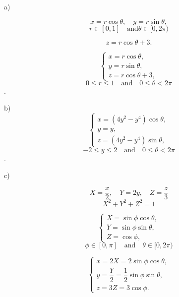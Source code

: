 \documentclass{report}
\begin{document}
\newpage 


    a)

    \[ x = r \cos\theta, \quad y = r \sin\theta, \]
    \[ r \in [0, 1] \quad  \text{and} \theta \in [0, 2\pi) \]

    \[ z = r \cos\theta + 3. \]

    \[ \begin{cases}
    x = r \cos\theta, \\
    y = r \sin\theta, \\
    z = r \cos\theta + 3,
    \end{cases} \]
    \[ 0 \leq r \leq 1 \quad  \text{and} \quad  0 \leq \theta < 2\pi \].

    b)
    \[ \begin{cases}
    x = \left(4y^2 - y^4\right) \cos\theta, \\
    y = y, \\
    z = \left(4y^2 - y^4\right) \sin\theta,
    \end{cases} \]
    \[ -2 \leq y \leq 2 \quad \text{and} \quad 0 \leq \theta < 2\pi \].


    c)

    \[ X = \dfrac{x}{2}, \quad Y = 2y, \quad Z = \dfrac{z}{3} \]
    \[ X^2 + Y^2 + Z^2 = 1 \]

    \[ \begin{cases}
    X = \sin\phi \cos\theta, \\
    Y = \sin\phi \sin\theta, \\
    Z = \cos\phi,
    \end{cases} \]
    \[ \phi \in [0, \pi] \quad \text{and} \quad  \theta \in [0, 2\pi) \]

    \[ \begin{cases}
    x = 2X = 2\sin\phi \cos\theta, \\
    y = \dfrac{Y}{2} = \dfrac{1}{2}\sin\phi \sin\theta, \\
    z = 3Z = 3\cos\phi.
    \end{cases} \]
\end{document}
